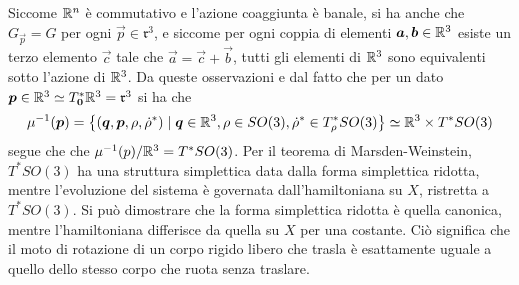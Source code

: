 Siccome $\mathbb{R}^{n}$ è commutativo e l'azione coaggiunta è banale, si ha anche che $G_{\vec{p}} = G$ per ogni $\vec{p} \in \mathfrak{r}^3$, e siccome per ogni coppia di elementi $\boldsymbol{a}, \boldsymbol{b} \in \mathbb{R}^3$ esiste un terzo elemento $\vec{c}$ tale che $\vec{a} = \vec{c} + \vec{b}$, tutti gli elementi di $\mathbb{R}^3$ sono equivalenti sotto l'azione di $\mathbb{R}^3$. Da queste osservazioni e dal fatto che per un dato $\boldsymbol{p} \in \mathbb{R}^3 \simeq T^*_{\boldsymbol{0}} \mathbb{R}^3 = \mathfrak{r}^3$ si ha che
\begin{equation}
\mu^{-1}(\boldsymbol{p}) = \big\lbrace(\boldsymbol{q},\boldsymbol{p}, \rho, \dot{\rho}^*) \mid \boldsymbol{q}\in \mathbb{R}^3, \rho \in SO(3), \dot{\rho}^* \in T^*_{\rho} SO(3)\big\rbrace \simeq \mathbb{R}^3 \times T^*SO(3)
\end{equation} 
segue che che $\mu^{-1}(p)/\mathbb{R}^3 = T^*SO(3)$. Per il teorema di Marsden-Weinstein, $T^* SO(3)$ ha una struttura simplettica data dalla forma simplettica ridotta, mentre l'evoluzione del sistema è governata dall'hamiltoniana su $X$, ristretta a $T^* SO(3)$. Si può dimostrare che la forma simplettica ridotta è quella canonica, mentre l'hamiltoniana differisce da quella su $X$ per una costante. Ciò significa che il moto di rotazione di un corpo rigido libero che trasla è esattamente uguale a quello dello stesso corpo che ruota senza traslare.


